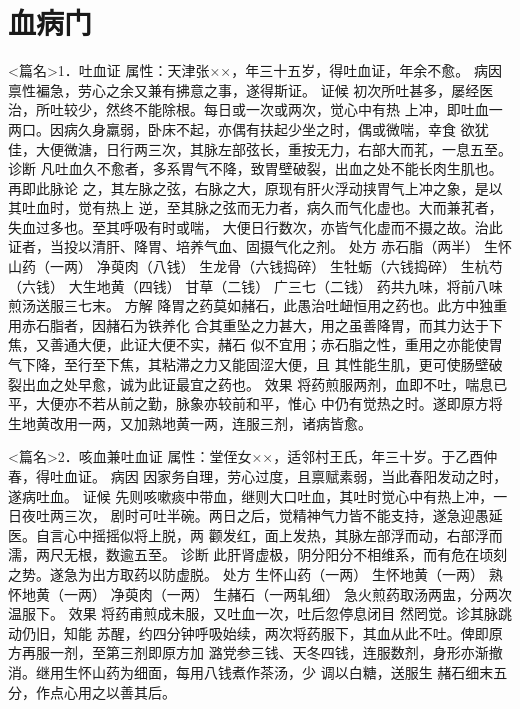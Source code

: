 \documentclass[a4paper,12pt,UTF8,twoside]{ctexbook}
\begin{document}
\chapter{血病门}
<篇名>1．吐血证
属性：天津张××，年三十五岁，得吐血证，年余不愈。 
病因 禀性褊急，劳心之余又兼有拂意之事，遂得斯证。 
证候 初次所吐甚多，屡经医治，所吐较少，然终不能除根。每日或一次或两次，觉心中有热 
上冲，即吐血一两口。因病久身羸弱，卧床不起，亦偶有扶起少坐之时，偶或微喘，幸食 
欲犹佳，大便微溏，日行两三次，其脉左部弦长，重按无力，右部大而芤，一息五至。 
诊断 凡吐血久不愈者，多系胃气不降，致胃壁破裂，出血之处不能长肉生肌也。再即此脉论 
之，其左脉之弦，右脉之大，原现有肝火浮动挟胃气上冲之象，是以其吐血时，觉有热上 
逆，至其脉之弦而无力者，病久而气化虚也。大而兼芤者，失血过多也。至其呼吸有时或喘， 
大便日行数次，亦皆气化虚而不摄之故。治此证者，当投以清肝、降胃、培养气血、固摄气化之剂。 
处方 赤石脂（两半） 生怀山药（一两） 净萸肉（八钱） 生龙骨（六钱捣碎） 
生牡蛎（六钱捣碎） 生杭芍（六钱） 大生地黄（四钱） 甘草（二钱） 广三七（二钱） 
药共九味，将前八味煎汤送服三七末。 
方解 降胃之药莫如赭石，此愚治吐衄恒用之药也。此方中独重用赤石脂者，因赭石为铁养化 
合其重坠之力甚大，用之虽善降胃，而其力达于下焦，又善通大便，此证大便不实，赭石 
似不宜用；赤石脂之性，重用之亦能使胃气下降，至行至下焦，其粘滞之力又能固涩大便，且 
其性能生肌，更可使肠壁破裂出血之处早愈，诚为此证最宜之药也。 
效果 将药煎服两剂，血即不吐，喘息已平，大便亦不若从前之勤，脉象亦较前和平，惟心 
中仍有觉热之时。遂即原方将生地黄改用一两，又加熟地黄一两，连服三剂，诸病皆愈。 


<篇名>2．咳血兼吐血证
属性：堂侄女××，适邻村王氏，年三十岁。于乙酉仲春，得吐血证。 
病因 因家务自理，劳心过度，且禀赋素弱，当此春阳发动之时，遂病吐血。 
证候 先则咳嗽痰中带血，继则大口吐血，其吐时觉心中有热上冲，一日夜吐两三次， 
剧时可吐半碗。两日之后，觉精神气力皆不能支持，遂急迎愚延医。自言心中摇摇似将上脱，两 
颧发红，面上发热，其脉左部浮而动，右部浮而濡，两尺无根，数逾五至。 
诊断 此肝肾虚极，阴分阳分不相维系，而有危在顷刻之势。遂急为出方取药以防虚脱。 
处方 生怀山药（一两） 生怀地黄（一两） 熟怀地黄（一两） 净萸肉（一两） 生赭石（一两轧细） 
急火煎药取汤两盅，分两次温服下。 
效果 将药甫煎成未服，又吐血一次，吐后忽停息闭目 然罔觉。诊其脉跳动仍旧，知能 
苏醒，约四分钟呼吸始续，两次将药服下，其血从此不吐。俾即原方再服一剂，至第三剂即原方加 
潞党参三钱、天冬四钱，连服数剂，身形亦渐撤消。继用生怀山药为细面，每用八钱煮作茶汤，少 
调以白糖，送服生 
赭石细末五分，作点心用之以善其后。 
\end{document}
